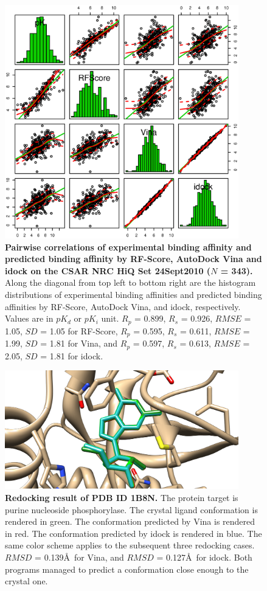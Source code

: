 \documentclass[10pt]{article}
\begin{document}
\begin{figure}[!ht]
\begin{center}
\includegraphics[width=4in]{CSAR2010Correlations.eps}
\end{center}
\caption{
{\bf Pairwise correlations of experimental binding affinity and predicted binding affinity by RF-Score, AutoDock Vina and idock on the CSAR NRC HiQ Set 24Sept2010 ($N$ = 343).} Along the diagonal from top left to bottom right are the histogram distributions of experimental binding affinities and predicted binding affinities by RF-Score, AutoDock Vina, and idock, respectively. Values are in $pK_d$ or $pK_i$ unit. $R_p$ = 0.899, $R_s$ = 0.926, $RMSE$ = 1.05, $SD$ = 1.05 for RF-Score, $R_p$ = 0.595, $R_s$ = 0.611, $RMSE$ = 1.99, $SD$ = 1.81 for Vina, and $R_p$ = 0.597, $R_s$ = 0.613, $RMSE$ = 2.05, $SD$ = 1.81 for idock.
}
\label{CSAR2010Correlations}
\end{figure}

\begin{figure}[!ht]
\begin{center}
\includegraphics[width=4in]{Redocking1B8N.eps}
\end{center}
\caption{
{\bf Redocking result of PDB ID 1B8N.} The protein target is purine nucleoside phosphorylase. The crystal ligand conformation is rendered in green. The conformation predicted by Vina is rendered in red. The conformation predicted by idock is rendered in blue. The same color scheme applies to the subsequent three redocking cases. $RMSD$ = 0.139\AA\ for Vina, and $RMSD$ = 0.127\AA\ for idock. Both programs managed to predict a conformation close enough to the crystal one.
}
\label{Redocking1B8N}
\end{figure}
\end{document}
